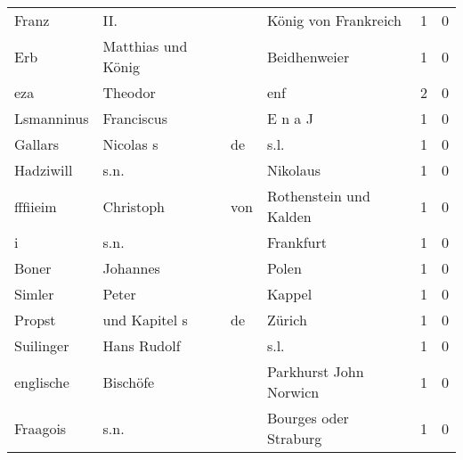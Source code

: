 \documentclass[10pt,a4paper,landscape]{article}
\begin{document}
\begin{longtable}{llllrr}
                    Franz &                                II. &             &                        König von Frankreich &          1 &         0 \\
                      Erb &                 Matthias und König &             &                                Beidhenweier &          1 &         0 \\
                      eza &                            Theodor &             &                                         enf &          2 &         0 \\
               Lsmanninus &                         Franciscus &             &                                     E n a J &          1 &         0 \\
                  Gallars &                          Nicolas s &          de &                                        s.l. &          1 &         0 \\
                Hadziwill &                               s.n. &             &                                    Nikolaus &          1 &         0 \\
                 fffiieim &                          Christoph &         von &                      Rothenstein und Kalden &          1 &         0 \\
                        i &                               s.n. &             &                                   Frankfurt &          1 &         0 \\
                    Boner &                           Johannes &             &                                       Polen &          1 &         0 \\
                   Simler &                              Peter &             &                                      Kappel &          1 &         0 \\
                   Propst &                      und Kapitel s &          de &                                      Zürich &          1 &         0 \\
                Suilinger &                        Hans Rudolf &             &                                        s.l. &          1 &         0 \\
                englische &                           Bischöfe &             &                      Parkhurst John Norwicn &          1 &         0 \\
                 Fraagois &                               s.n. &             &                       Bourges oder Straburg &          1 &         0 \\

\end{longtable}
\end{document}
